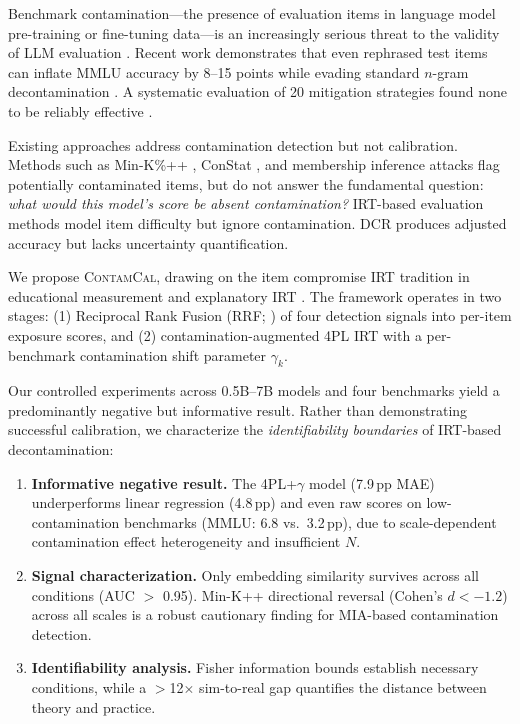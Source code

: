 \documentclass[11pt,a4paper]{article}
\begin{document}
Benchmark contamination---the presence of evaluation items in language model pre-training or fine-tuning data---is an increasingly serious threat to the validity of LLM evaluation \citep{magar2022data, jacovi2023stop, balloccu2024leak}.
Recent work demonstrates that even rephrased test items can inflate MMLU accuracy by 8--15 points while evading standard $n$-gram decontamination \citep{yang2023rethinking, deng2024investigating}.
A systematic evaluation of 20 mitigation strategies found none to be reliably effective \citep{xu2024benchmarking}.

Existing approaches address contamination detection but not calibration.
Methods such as Min-K\%++ \citep{shi2024detecting}, ConStat \citep{dekoninck2024constat}, and membership inference attacks \citep{shokri2017membership, carlini2022quantifying} flag potentially contaminated items, but do not answer the fundamental question: \emph{what would this model's score be absent contamination?}
IRT-based evaluation methods \citep{lalor2024benchmarking, polo2024tinybenchmarks} model item difficulty but ignore contamination.
DCR \citep{oren2024proving} produces adjusted accuracy but lacks uncertainty quantification.

We propose \textsc{ContamCal}, drawing on the item compromise IRT tradition in educational measurement \citep{eckerly2017detecting, sinharay2017assessment} and explanatory IRT \citep{deboeck2004explanatory}.
The framework operates in two stages: (1) Reciprocal Rank Fusion (RRF; \citealt{cormack2009reciprocal}) of four detection signals into per-item exposure scores, and (2) contamination-augmented 4PL IRT with a per-benchmark contamination shift parameter $\gamma_k$.

Our controlled experiments across 0.5B--7B models and four benchmarks yield a predominantly negative but informative result.
Rather than demonstrating successful calibration, we characterize the \emph{identifiability boundaries} of IRT-based decontamination:

\begin{enumerate}
    \item \textbf{Informative negative result.} The 4PL+$\gamma$ model (7.9\,pp MAE) underperforms linear regression (4.8\,pp) and even raw scores on low-contamination benchmarks (MMLU: 6.8 vs.\ 3.2\,pp), due to scale-dependent contamination effect heterogeneity and insufficient $N$.
    \item \textbf{Signal characterization.} Only embedding similarity survives across all conditions (AUC $>$ 0.95). Min-K++ directional reversal (Cohen's $d < -1.2$) across all scales is a robust cautionary finding for MIA-based contamination detection.
    \item \textbf{Identifiability analysis.} Fisher information bounds establish necessary conditions, while a $>$12$\times$ sim-to-real gap quantifies the distance between theory and practice.
\end{enumerate}
\end{document}
